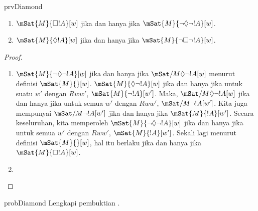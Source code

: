 \documentclass[../../../include/open-logic-section]{subfiles}
\begin{document}
\begin{tagblock}{prvDiamond}
\begin{prop}
  \begin{enumerate}
  \item $\mSat{M}{\Box !A}[w]$ jika dan hanya jika $\mSat{M}{\lnot\Diamond\lnot !A}[w]$.
  \item $\mSat{M}{\Diamond !A}[w]$ jika dan hanya jika $\mSat{M}{\lnot\Box\lnot !A}[w]$.
  \end{enumerate}
\end{prop}

\begin{proof}
  \begin{enumerate}
    \item $\mSat{M}{\lnot\Diamond\lnot !A}[w]$ jika dan hanya jika
      $\mSat/{M}{\Diamond\lnot !A}[w]$ menurut definisi $\mSat{M}{}[w]$.
      $\mSat{M}{\Diamond\lnot !A}[w]$ jika dan hanya jika untuk suatu $w'$
      dengan $Rww'$, $\mSat{M}{\lnot !A}[w']$. Maka,
      $\mSat/{M}{\Diamond\lnot !A}[w]$ jika dan hanya jika untuk semua $w'$
      dengan $Rww'$, $\mSat/{M}{\lnot !A}[w']$. Kita juga mempunyai
      $\mSat/{M}{\lnot !A}[w']$ jika dan hanya jika $\mSat{M}{!A}[w']$.
      Secara keseluruhan, kita memperoleh
      $\mSat{M}{\lnot\Diamond\lnot !A}[w]$ jika dan hanya jika untuk semua
      $w'$ dengan $Rww'$, $\mSat{M}{!A}[w']$. Sekali lagi menurut definisi
      $\mSat{M}{}[w]$, hal itu berlaku jika dan hanya jika
      $\mSat{M}{\Box !A}[w]$.
    \item {}
  \end{enumerate}
\end{proof}

\begin{probtag}{probDiamond}
  Lengkapi pembuktian .
\end{probtag}
\end{tagblock}
\end{document}
